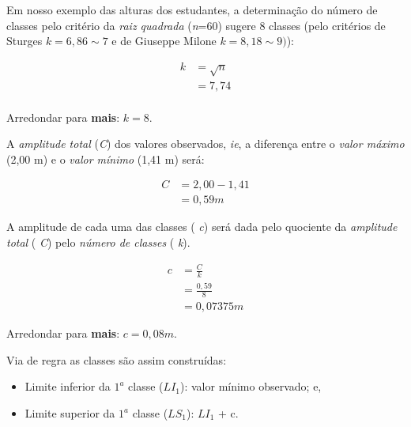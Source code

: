 \documentclass[
]{book}
\providecommand{\tightlist}{%
  \setlength{\itemsep}{0pt}\setlength{\parskip}{0pt}}
\begin{document}
\hfill\break

Em nosso exemplo das alturas dos estudantes, a determinação do número de classes pelo critério da \emph{raiz quadrada} (\emph{n}=60) sugere 8 classes (pelo critérios de Sturges \(k=6,86 \sim 7\) e de Giuseppe Milone \(k=8,18 \sim 9)\)):

\hfill\break

\begin{align*}
k & =\sqrt{n} \\
 & = 7,74 \\
\end{align*}

\hfill\break

Arredondar para \textbf{mais}: \(k=8\).

\hfill\break

A \emph{amplitude total} (\emph{C}) dos valores observados, \emph{ie}, a diferença entre o \emph{valor máximo} (2,00 m) e o \emph{valor mínimo} (1,41 m) será:

\hfill\break

\begin{align*}
C & =2,00-1,41 \\
 & =0,59 m 
\end{align*}

\hfill\break

A amplitude de cada uma das classes ( \emph{c}) será dada pelo quociente da \emph{amplitude total} ( \emph{C}) pelo \emph{número de classes} ( \emph{k}).

\hfill\break

\begin{align*}
c & = \frac{C}{k} \\
  & = \frac{0,59}{8}\\ 
  & = 0,07375 m
\end{align*}

\hfill\break

Arredondar para \textbf{mais}: \(c=0,08 m\).

\hfill\break

Via de regra as classes são assim construídas:

\hfill\break

\begin{itemize}
\tightlist
\item
  Limite inferior da \(1^{a}\) classe (\(LI_{1}\)): valor mínimo observado; e,
\item
  Limite superior da \(1^{a}\) classe (\(LS_{1}\)): \(LI_{1}\) + c.~
\end{itemize}
\end{document}
